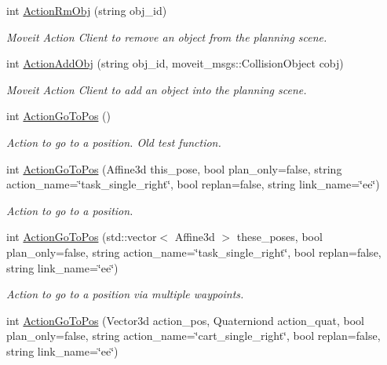 \begin{DoxyCompactItemize}
int \hyperlink{structManipulate_a5d17ffae09965e37c79af214bdcc99fd}{Action\+Rm\+Obj} (string obj\+\_\+id)
\begin{DoxyCompactList}\small\item\em Moveit Action Client to remove an object from the planning scene. \end{DoxyCompactList}\item 
int \hyperlink{structManipulate_a56189f1ea0370b1e8d680afe6cd886ea}{Action\+Add\+Obj} (string obj\+\_\+id, moveit\+\_\+msgs\+::\+Collision\+Object cobj)
\begin{DoxyCompactList}\small\item\em Moveit Action Client to add an object into the planning scene. \end{DoxyCompactList}\item 
int \hyperlink{structManipulate_a71a541174e9e4c83d1c7786a12ed19c4}{Action\+Go\+To\+Pos} ()
\begin{DoxyCompactList}\small\item\em Action to go to a position. Old test function. \end{DoxyCompactList}\item 
int \hyperlink{structManipulate_a27ddd517fdecd8eadd65d0b34efca2d1}{Action\+Go\+To\+Pos} (Affine3d this\+\_\+pose, bool plan\+\_\+only=false, string action\+\_\+name=\char`\"{}task\+\_\+single\+\_\+right\char`\"{}, bool replan=false, string link\+\_\+name=\char`\"{}ee\char`\"{})
\begin{DoxyCompactList}\small\item\em Action to go to a position. \end{DoxyCompactList}\item 
int \hyperlink{structManipulate_a73591582a036d5bfd1891b27b375ace4}{Action\+Go\+To\+Pos} (std\+::vector$<$ Affine3d $>$ these\+\_\+poses, bool plan\+\_\+only=false, string action\+\_\+name=\char`\"{}task\+\_\+single\+\_\+right\char`\"{}, bool replan=false, string link\+\_\+name=\char`\"{}ee\char`\"{})
\begin{DoxyCompactList}\small\item\em Action to go to a position via multiple waypoints. \end{DoxyCompactList}\item 
int \hyperlink{structManipulate_a6ceaa1e96d861f3d8f01d5b16dfbafca}{Action\+Go\+To\+Pos} (Vector3d action\+\_\+pos, Quaterniond action\+\_\+quat, bool plan\+\_\+only=false, string action\+\_\+name=\char`\"{}cart\+\_\+single\+\_\+right\char`\"{}, bool replan=false, string link\+\_\+name=\char`\"{}ee\char`\"{})

\end{DoxyCompactItemize}
